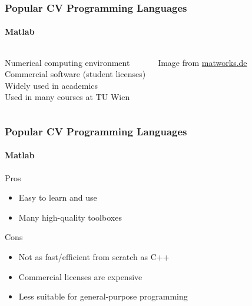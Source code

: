 \documentclass[xetex,professionalfont]{beamer}
\begin{document}
\begin{frame}
\frametitle{Popular CV Programming Languages}
\framesubtitle{Matlab}

\begin{columns}

Numerical computing environment \\\medskip
Commercial software (student licenses)\\\medskip
Widely used in academics \\\medskip
Used in many courses at TU Wien


\begin{center}
{
	{\centering Image from \url{matworks.de}}}
\end{center}

\end{columns}

\end{frame}


\begin{frame}
\frametitle{Popular CV Programming Languages}
\framesubtitle{Matlab}

Pros
\begin{itemize}
	\item Easy to learn and use
	\item Many high-quality toolboxes
\end{itemize}

\bigskip
Cons
\begin{itemize}
	\item Not as fast/efficient from scratch as C++ %
	\item Commercial licenses are expensive
	\item Less suitable for general-purpose programming
\end{itemize}

\end{frame}

\end{document}
